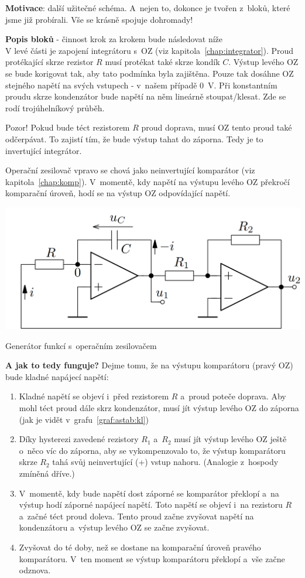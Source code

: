 \documentclass[a4paper,12pt]{article}   %
\begin{document}
\textbf{Motivace}: další užitečné schéma. A~nejen to, dokonce je tvořen z~bloků, které jsme již probírali. Vše se krásně spojuje dohromady!

\textbf{Popis bloků }- činnost krok za krokem bude následovat níže\\
V levé části je zapojení integrátoru s~OZ (viz kapitola~\ref{chap:integrator}). Proud protékající skrze rezistor $R$ musí protékat také skrze kondík $C$. Výstup levého OZ se bude korigovat tak, aby tato podmínka byla zajištěna. Pouze tak dosáhne OZ stejného napětí na svých vstupech - v~našem případě 0~V. Při konstantním proudu skrze kondenzátor bude napětí na něm lineárně stoupat/klesat. Zde se rodí trojúhelníkový průběh.

Pozor! Pokud bude téct rezistorem $R$ proud doprava, musí OZ tento proud také odčerpávat. To zajistí tím, že bude výstup tahat do záporna. Tedy je to invertující integrátor.

Operační zesilovač vpravo se chová jako neinvertující komparátor (viz kapitola~\ref{chap:komp}). V~momentě, kdy napětí na výstupu levého OZ překročí komparační úroveň, hodí se na výstup OZ odpovídající napětí.
\begin{schema}[h!]
    \centering
    \includegraphics[width=.7\textwidth]{gen_funct.PNG}
    \caption{Generátor funkcí s~operačním zesilovačem}
    \label{sch:gen:fci}
\end{schema}

\textbf{A jak to tedy funguje?} Dejme tomu, že na výstupu komparátoru (pravý OZ) bude kladné napájecí napětí:
\begin{enumerate}
    \item Kladné napětí se objeví i~před rezistorem $R$ a~proud poteče doprava. Aby mohl téct proud dále skrz kondenzátor, musí jít výstup levého OZ do záporna (jak je vidět v~grafu~\ref{graf:astab:kl})
    \item Díky hysterezi zavedené rezistory $R_1$ a~$R_2$ musí jít výstup levého OZ ještě o~něco víc do záporna, aby se vykompenzovalo to, že výstup komparátoru skrze $R_2$ tahá svůj neinvertující (+) vstup nahoru. (Analogie z~hospody zmíněná dříve.)
    \item V~momentě, kdy bude napětí dost záporné se komparátor překlopí a~na výstup hodí záporné napájecí napětí. Toto napětí se objeví i~na rezistoru $R$ a~začné téct proud doleva. Tento proud začne zvyšovat napětí na kondenzátoru a~výstup levého OZ se začne zvyšovat.
    \item Zvyšovat do té doby, než se dostane na komparační úroveň pravého komparátoru. V~ten moment se výstup komparátoru překlopí a~vše začne odznova.
\end{enumerate}
\end{document}

